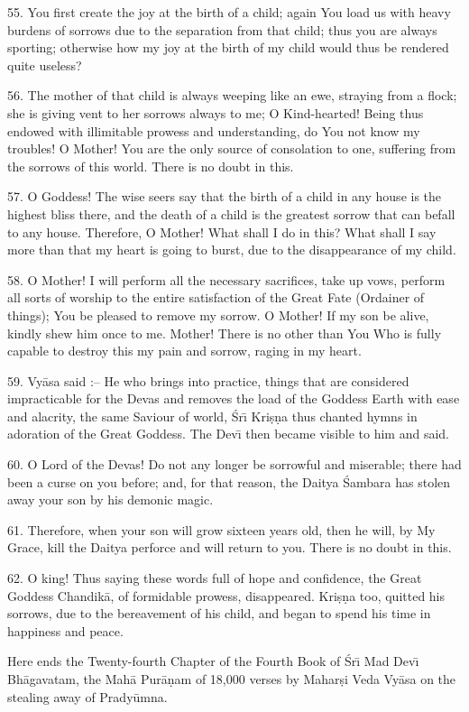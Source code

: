 55. You first create the joy at the birth of a child; again You load us with heavy burdens of sorrows due to the separation from that child; thus you are always sporting; otherwise how my joy at the birth of my child would thus be rendered quite useless?

56. The mother of that child is always weeping like an ewe, straying from a flock; she is giving vent to her sorrows always to me; O Kind-hearted! Being thus endowed with illimitable prowess and understanding, do You not know my troubles! O Mother! You are the only source of consolation to one, suffering from the sorrows of this world. There is no doubt in this.

57. O Goddess! The wise seers say that the birth of a child in any house is the highest bliss there, and the death of a child is the greatest sorrow that can befall to any house. Therefore, O Mother! What shall I do in this? What shall I say more than that my heart is going to burst, due to the disappearance of my child.

58. O Mother! I will perform all the necessary sacrifices, take up vows, perform all sorts of worship to the entire satisfaction of the Great Fate (Ordainer of things); You be pleased to remove my sorrow. O Mother! If my son be alive, kindly shew him once to me. Mother! There is no other than You Who is fully capable to destroy this my pain and sorrow, raging in my heart.

59. Vy\=asa said :-- He who brings into practice, things that are considered impracticable for the Devas and removes the load of the Goddess Earth with ease and alacrity, the same Saviour of world, \'Sr\={\i} Kri\d{s}\d{n}a thus chanted hymns in adoration of the Great Goddess. The Dev\={\i} then became visible to him and said.

60. O Lord of the Devas! Do not any longer be sorrowful and miserable; there had been a curse on you before; and, for that reason, the Daitya \'Sambara has stolen away your son by his demonic magic.

61. Therefore, when your son will grow sixteen years old, then he will, by My Grace, kill the Daitya perforce and will return to you. There is no doubt in this.

62. O king! Thus saying these words full of hope and confidence, the Great Goddess Chandik\=a, of formidable prowess, disappeared. Kri\d{s}\d{n}a too, quitted his sorrows, due to the bereavement of his child, and began to spend his time in happiness and peace.

Here ends the Twenty-fourth Chapter of the Fourth Book of \'Sr\={\i} Mad Dev\={\i} Bh\=agavatam, the Mah\=a Pur\=a\d{n}am of 18,000 verses by Mahar\d{s}i Veda Vy\=asa on the stealing away of Prady\=umna.



